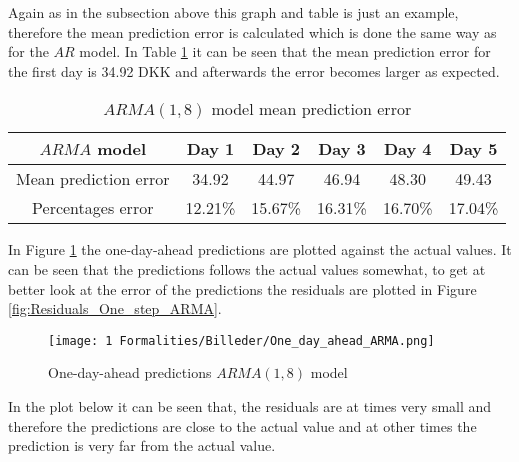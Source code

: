 \noindent Again as in the subsection above this graph and table is just an example, therefore the mean prediction error is calculated which is done the same way as for the $AR$ model. In Table \ref{tab:ARMA_mean_prediction_error} it can be seen that the mean prediction error for the first day is 34.92 DKK and afterwards the error becomes larger as expected.

\begin{table}[H]
  \centering
  \begin{tabular}{|c|c|c|c|c|c|}
    \hline
    $ARMA$ model & Day 1 & Day 2 & Day 3 & Day 4 & Day 5 \\
    \hline
    Mean prediction error & 34.92 & 44.97 & 46.94 & 48.30 & 49.43  \\
    \hline
    Percentages error & 12.21\% & 15.67\% & 16.31\% & 16.70\% & 17.04\%  \\
    \hline
    
  \end{tabular}
  \caption{$ARMA(1,8)$ model mean prediction error}
  \label{tab:ARMA_mean_prediction_error}
\end{table}
\noindent In Figure \ref{fig:One_day_ahead_ARMA} the one-day-ahead predictions are plotted against the actual values. It can be seen that the predictions follows the actual values somewhat, to get at better look at the error of the predictions the residuals are plotted in Figure \ref{fig:Residuals_One_step_ARMA}.
\begin{figure}[H]
    \centering
    \texttt{[image: 1 Formalities/Billeder/One\_day\_ahead\_ARMA.png]}
    \caption{One-day-ahead predictions $ARMA(1,8)$ model}
    \label{fig:One_day_ahead_ARMA}
\end{figure}
\noindent In the plot below it can be seen that, the residuals are at times very small and therefore the predictions are close to the actual value and at other times the prediction is very far from the actual value.

